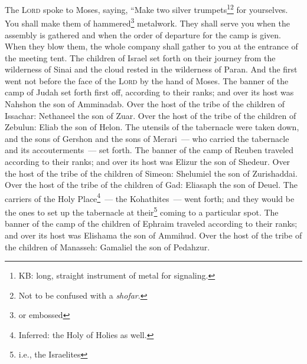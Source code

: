 
\begin{enumerate*}[mode=unboxed]
     The \textsc{Lord} spoke to Moses, saying,%
     ``Make two silver trumpets\footnote{KB: long, straight instrument of metal for signaling.}\footnote{Not to be confused with a \textit{shofar}.} for yourselves. You shall make them of hammered\footnote{or embossed} metalwork. They shall serve you when the assembly is gathered and when the order of departure for the camp is given.%
     When they blow them, the whole company shall gather to you at the entrance of the meeting tent.%
     The children of Israel set forth on their journey from the wilderness of Sinai and the cloud rested in the wilderness of Paran.%
     And the first went not before the face of the \textsc{Lord} by the hand of Moses.%
     The banner of the camp of Judah set forth first off, according to their ranks; and over its host was Nahshon the son of Amminadab.%
     Over the host of the tribe of the children of Issachar: Nethaneel the son of Zuar.%
     Over the host of the tribe of the children of Zebulun: Eliab the son of Helon.%
     The utensils of the tabernacle were taken down, and the sons of Gershon and the sons of Merari~--- who carried the tabernacle and its accouterments~--- set forth.%
     The banner of the camp of Reuben traveled according to their ranks; and over its host was Elizur the son of Shedeur.%
     Over the host of the tribe of the children of Simeon: Shelumiel the son of Zurishaddai.%
     Over the host of the tribe of the children of Gad: Eliasaph the son of Deuel.%
     The carriers of the Holy Place\footnote{Inferred: the Holy of Holies as well.}~--- the Kohathites~--- went forth; and they would be the ones to set up the tabernacle at their\footnote{i.e., the Israelites} coming to a particular spot.%
     The banner of the camp of the children of Ephraim traveled according to their ranks; and over its host was Elishama the son of Ammihud.%
     Over the host of the tribe of the children of Manasseh: Gamaliel the son of Pedahzur.%

\end{enumerate*}
